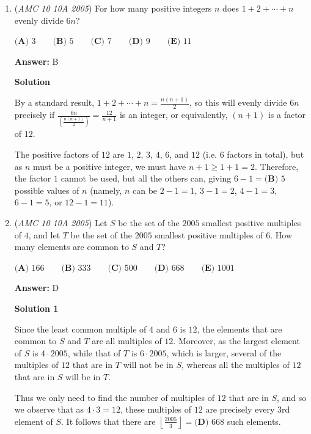 \begin{enumerate}
 


	\item (\textit{AMC 10 10A 2005}) For how many positive integers $n$ does $1+2+\dotsb+n$ evenly divide $6n$? 


 $\textbf{(A) } 3\qquad \textbf{(B) } 5\qquad \textbf{(C) } 7\qquad \textbf{(D) } 9\qquad \textbf{(E) } 11$

 \textbf{Answer: }B



\textbf{Solution}

By a standard result, $1+2+\dotsb+n = \frac{n(n+1)}{2}$, so this will evenly divide $6n$ precisely if $\frac{6n}{\left(\frac{n(n+1)}{2}\right)} = \frac{12}{n+1}$ is an integer, or equivalently, $(n+1)$ is a factor of $12$. 

 The positive factors of $12$ are $1$, $2$, $3$, $4$, $6$, and $12$ (i.e. $6$ factors in total), but as $n$ must be a positive integer, we must have $n+1 \geq 1+1 = 2$. Therefore, the factor $1$ cannot be used, but all the others can, giving $6-1 = \boxed{\textbf{(B) } 5}$ possible values of $n$ (namely, $n$ can be $2-1 = 1$, $3-1 = 2$, $4-1 = 3$, $6-1 = 5$, or $12-1 = 11$).

 


	\item (\textit{AMC 10 10A 2005}) Let $S$ be the set of the $2005$ smallest positive multiples of $4$, and let $T$ be the set of the $2005$ smallest positive multiples of $6$. How many elements are common to $S$ and $T$?


 $\textbf{(A) } 166\qquad \textbf{(B) } 333\qquad \textbf{(C) } 500\qquad \textbf{(D) } 668\qquad \textbf{(E) } 1001$

 \textbf{Answer: }D



\textbf{Solution 1}

Since the least common multiple of $4$ and $6$ is $12$, the elements that are common to $S$ and $T$ are all multiples of $12$. Moreover, as the largest element of $S$ is $4 \cdot 2005$, while that of $T$ is $6 \cdot 2005$, which is larger, several of the multiples of $12$ that are in $T$ will not be in $S$, whereas all the multiples of $12$ that are in $S$ will be in $T$.

 Thus we only need to find the number of multiples of $12$ that are in $S$, and so we observe that as $4 \cdot 3 = 12$, these multiples of $12$ are precisely every $3$rd element of $S$. It follows that there are $\left\lfloor\frac{2005}{3}\right \rfloor = \boxed{\textbf{(D) } 668}$ such elements.


\end{enumerate}
